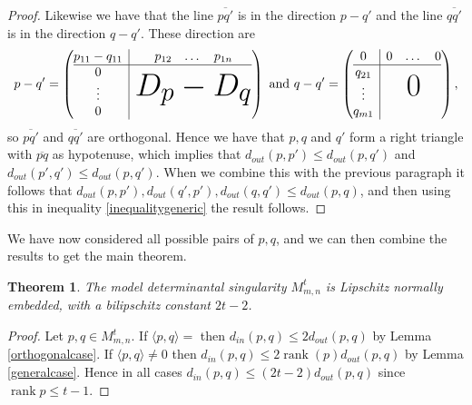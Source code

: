 \documentclass[a4paper,oneside]{amsart}
\newtheorem{thm}{Theorem}[section]
\theoremstyle{definition}
\begin{document}
\begin{proof}
Likewise we have that the line $\overline{pq'}$ is in the direction
$p-q'$ and the line $\overline{qq '}$ is in the direction
$q-q'$. These direction are 
\begin{align*}
p-q'=\left(
\begin{array}{@{} c | c @{}}
p_{11}-q_{11} & \begin{matrix} p_{12} & \dots & p_{1n} \end{matrix} \\ \hline
\begin{matrix} 0 \\ \vdots \\ 0 \end{matrix} & \text{\Huge $D_p-D_q$}
\end{array}
\right)\text{ and } q-q'=\left(
\begin{array}{@{} c | c @{}}
0 & \begin{matrix} 0 & \dots & 0 \end{matrix} \\ \hline
\begin{matrix} q_{21} \\ \vdots \\ q_{m1} \end{matrix} & \text{\Huge
  $0$}
\end{array}
\right),
\end{align*}
so $\overline{pq'}$ and $\overline{qq '}$ are orthogonal. Hence we
have that $p,q$ and $q'$ form a right triangle with $\overline{pq}$ as
hypotenuse, which implies that $d_{out}(p,p') \leq d_{out}(p,q')$ and
$d_{out}(p',q') \leq d_{out}(p,q')$. When we combine this with the
previous 
paragraph it follows that $d_{out}(p,p'), d_{out}(q',p'), d_{out}(q,q') \leq
d_{out}(p,q)$, and then using this in inequality
\eqref{inequalitygeneric} the result follows. 

\end{proof}

We have now considered all possible pairs of $p,q$, and we can then
combine the results to get the main theorem.

\begin{thm}
The model determinantal singularity ${M^{ {t} }_{m,n}}$ is Lipschitz normally
embedded, with a bilipschitz constant $2t-2$. 
\end{thm}
\begin{proof}
Let $p,q\in{M^{ {t} }_{m,n}}$. If $\langle p,q \rangle=$ then $d_{in}(p,q)\leq
2d_{out}(p,q)$ by Lemma
\ref{orthogonalcase}. If $\langle p,q \rangle \neq 0$ then
$d_{in}(p,q)\leq 2{\operatorname{rank}}(p)d_{out}(p,q)$ by Lemma
\ref{generalcase}. Hence in all cases $d_{in}(p,q)\leq (2t-2)d_{out}(p,q)$
since ${\operatorname{rank}} p\leq t-1$.
\end{proof}
\end{document}
